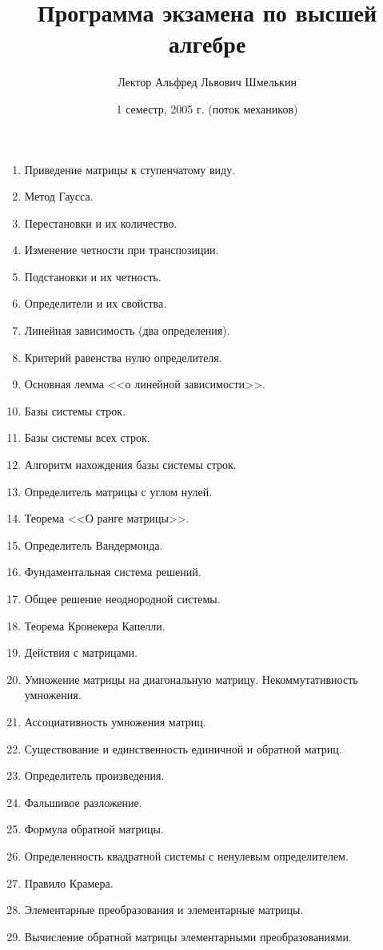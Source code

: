\documentclass[a4paper]{article}
\title{Программа экзамена по высшей алгебре}
\author{Лектор Альфред Львович Шмелькин}
\date{1 семестр, 2005 г. (поток механиков)}
\begin{document}
\maketitle
\begin{enumerate}
\item Приведение матрицы к ступенчатому виду.
\item Метод Гаусса.
\item Перестановки и их количество.
\item Изменение четности при транспозиции.
\item Подстановки и их четность.
\item Определители и их свойства.
\item Линейная зависимость (два определения).
\item Критерий равенства нулю определителя.
\item Основная лемма <<о линейной зависимости>>.
\item Базы системы строк.
\item Базы системы всех строк.
\item  Алгоритм нахождения базы системы строк.
\item  Определитель матрицы с углом нулей.
\item  Теорема <<О ранге матрицы>>.
\item  Определитель Вандермонда.
\item  Фундаментальная система решений.
\item  Общее решение неоднородной системы.
\item  Теорема Кронекера Капелли.
\item  Действия с матрицами.
\item  Умножение матрицы на диагональную матрицу. Некоммутативность умножения.
\item  Ассоциативность умножения матриц.
\item  Существование и единственность единичной и обратной матриц.
\item  Определитель произведения.
\item  Фальшивое разложение.
\item  Формула обратной матрицы.
\item  Определенность квадратной системы с ненулевым определителем.
\item  Правило Крамера.
\item  Элементарные преобразования и элементарные матрицы.
\item  Вычисление обратной матрицы элементарными преобразованиями.

\end{enumerate}
\end{document}
